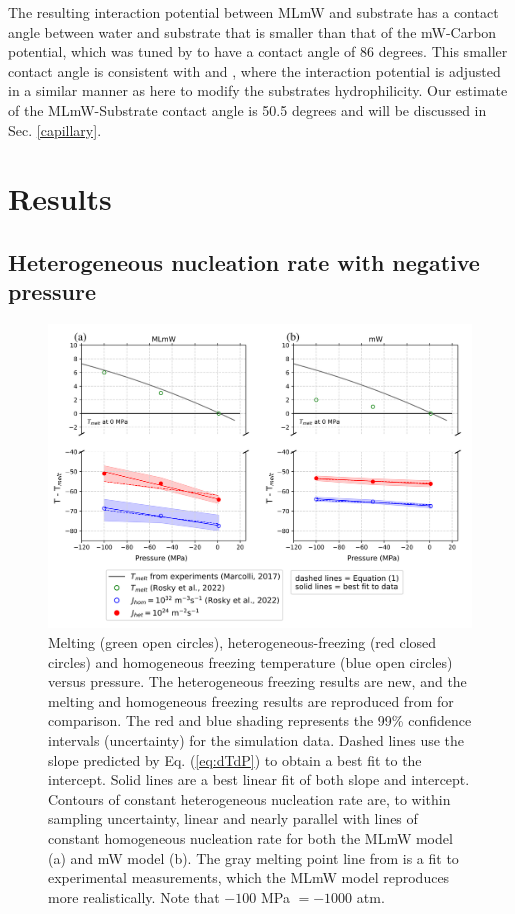 \documentclass[journal abbreviation, manuscript]{copernicus}
\begin{document}
The resulting interaction potential between MLmW and substrate has a contact angle between water and substrate that is smaller than that of the mW-Carbon potential, which was tuned by \citet{lupi2014} to have a contact angle of 86 degrees. This smaller contact angle is consistent with \citet{Bi2016} and \citet{lupi2014hydrophilicity}, where the interaction potential is adjusted in a similar manner as here to modify the substrates hydrophilicity. Our estimate of the MLmW-Substrate contact angle is 50.5 degrees and will be discussed in Sec. \ref{capillary}.



\section{Results}
\subsection{Heterogeneous nucleation rate with negative pressure} \label{sec:hetrate}

\begin{figure}[t]
\includegraphics[width=12cm]{figures/homohet_PT_figure.png}
\caption{\label{fig:PT} Melting (green open circles), heterogeneous-freezing (red closed circles) and homogeneous freezing temperature (blue open circles) versus pressure. The heterogeneous freezing results are new, and the melting and homogeneous freezing results are reproduced from \citet{rosky2022} for comparison. The red and blue shading represents the 99\% confidence intervals (uncertainty) for the simulation data. Dashed lines use the slope predicted by Eq. (\ref{eq:dTdP}) to obtain a best fit to the intercept. Solid lines are a best linear fit of both slope and intercept. Contours of constant heterogeneous nucleation rate are, to within sampling uncertainty, linear and nearly parallel with lines of constant homogeneous nucleation rate for both the MLmW model (a) and mW model (b).  The gray melting point line from \citet{marcolli2017} is a fit to experimental measurements, which the MLmW model reproduces more realistically. Note that $-100$ MPa $= -1000$ atm.}
\end{figure}
\end{document}
